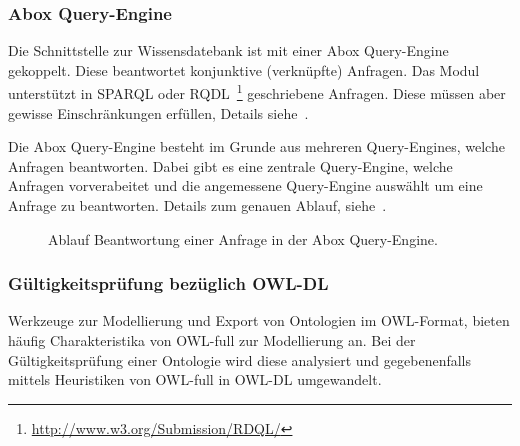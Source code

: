 \subsubsection{Abox Query-Engine}
\label{ssubsection:inferenz_pellet_aboxquery}
Die Schnittstelle zur Wissensdatebank ist mit einer Abox Query-Engine gekoppelt. Diese beantwortet konjunktive (verknüpfte) Anfragen. Das Modul unterstützt in SPARQL oder RQDL~\footnote{\url{http://www.w3.org/Submission/RDQL/}} geschriebene Anfragen. Diese müssen aber gewisse Einschränkungen erfüllen, Details siehe~\cite[Seiten 10 und 11]{sirin:pellet05}.

Die Abox Query-Engine besteht im Grunde aus mehreren Query-Engines, welche Anfragen beantworten. Dabei gibt es eine zentrale Query-Engine, welche Anfragen vorverabeitet und die angemessene Query-Engine auswählt um eine Anfrage zu beantworten. Details zum genauen Ablauf, siehe~\cite[Seite 11]{sirin:pellet05}.

\begin{figure}[htbp]
    \centering {}
    \caption{Ablauf Beantwortung einer Anfrage in der Abox Query-Engine.\label{fig:pellet_queryengine_komponenten}\protect\footnotemark}
\end{figure}

\subsubsection{Gültigkeitsprüfung bezüglich OWL-DL}
\label{ssubsection:inferenz_pellet_owldl}
Werkzeuge zur Modellierung und Export von Ontologien im OWL-Format, bieten häufig Charakteristika von OWL-full zur Modellierung an. Bei der Gültigkeitsprüfung einer Ontologie wird diese analysiert und gegebenenfalls mittels Heuristiken von OWL-full in OWL-DL umgewandelt.

